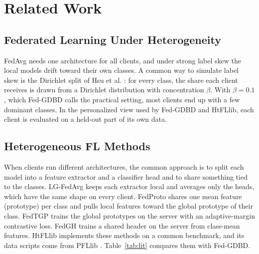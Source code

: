 \documentclass[conference]{IEEEtran}
\begin{document}
\section{Related Work}
\label{sec:related}

\subsection{Federated Learning Under Heterogeneity}
FedAvg \cite{mcmahan2017fedavg} needs one architecture for all clients, and under strong label skew the local models drift toward their own classes. A common way to simulate label skew is the Dirichlet split of Hsu et al. \cite{hsu2019noniid}: for every class, the share each client receives is drawn from a Dirichlet distribution with concentration $\beta$. With $\beta=0.1$, which Fed-GDBD calls the practical setting, most clients end up with a few dominant classes. In the personalized view used by Fed-GDBD and HtFLlib, each client is evaluated on a held-out part of its own data.

\subsection{Heterogeneous FL Methods}
When clients run different architectures, the common approach is to split each model into a feature extractor and a classifier head and to share something tied to the classes. LG-FedAvg \cite{liang2020lgfedavg} keeps each extractor local and averages only the heads, which have the same shape on every client. FedProto \cite{tan2022fedproto} shares one mean feature (prototype) per class and pulls local features toward the global prototype of their class. FedTGP \cite{zhang2024fedtgp} trains the global prototypes on the server with an adaptive-margin contrastive loss. FedGH \cite{yi2023fedgh} trains a shared header on the server from class-mean features. HtFLlib \cite{zhang2025htfllib} implements these methods on a common benchmark, and its data scripts come from PFLlib \cite{zhang2025pfllib}. Table~\ref{tab:lit} compares them with Fed-GDBD.
\end{document}
